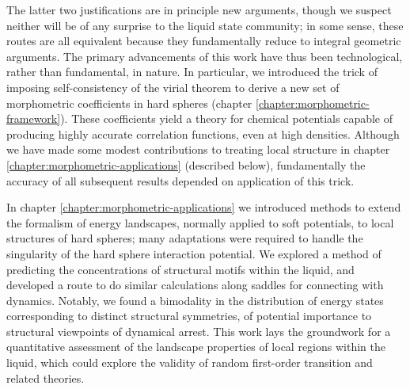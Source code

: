 \documentclass[11pt,twoside]{report}
\begin{document}
The latter two justifications are in principle new arguments, though we suspect neither will be of any surprise to the liquid state community; in some sense, these routes are all equivalent because they fundamentally reduce to integral geometric arguments.
The primary advancements of this work have thus been technological, rather than fundamental, in nature.
In particular, we introduced the trick of imposing self-consistency of the virial theorem to derive a new set of morphometric coefficients in hard spheres (chapter \ref{chapter:morphometric-framework}).
These coefficients yield a theory for chemical potentials capable of producing highly accurate correlation functions, even at high densities.
Although we have made some modest contributions to treating local structure in chapter \ref{chapter:morphometric-applications} (described below), fundamentally the accuracy of all subsequent results depended on application of this trick.

In chapter \ref{chapter:morphometric-applications} we introduced methods to extend the formalism of energy landscapes, normally applied to soft potentials, to local structures of hard spheres; many adaptations were required to handle the singularity of the hard sphere interaction potential.
We explored a method of predicting the concentrations of structural motifs within the liquid, and developed a route to do similar calculations along saddles
for connecting with dynamics.
Notably, we found a bimodality in the distribution of energy states corresponding to distinct structural symmetries, of potential importance to structural viewpoints of dynamical arrest.
This work lays the groundwork for a quantitative assessment of the landscape properties of local regions within the liquid, which could explore the validity of random first-order transition and related theories.
\end{document}
